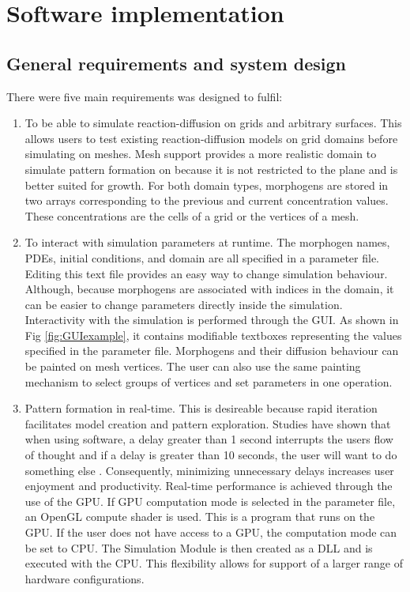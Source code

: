 \chapter{Software implementation}

\section{General requirements and system design}
There were five main requirements \ProgramName{} was designed to fulfil:

\begin{enumerate}
	\item To be able to simulate reaction-diffusion on grids and arbitrary surfaces. This allows users to test existing reaction-diffusion models on grid domains before simulating on meshes. Mesh support provides a more realistic domain to simulate pattern formation on because it is not restricted to the plane and is better suited for growth. For both domain types, morphogens are stored in two arrays corresponding to the previous and current concentration values. These concentrations are the cells of a grid or the vertices of a mesh. 
	
	\item To interact with simulation parameters at runtime. The morphogen names, PDEs, initial conditions, and domain are all specified in a parameter file. Editing this text file provides an easy way to change simulation behaviour. Although, because morphogens are associated with indices in the domain, it can be easier to change parameters directly inside the simulation. Interactivity with the simulation is performed through the GUI. As shown in Fig \ref{fig:GUIexample}, it contains modifiable textboxes representing the values specified in the parameter file. Morphogens and their diffusion behaviour can be painted on mesh vertices. The user can also use the same painting mechanism to select groups of vertices and set parameters in one operation. 

	\item Pattern formation in real-time. This is desireable because rapid iteration facilitates model creation and pattern exploration. Studies have shown that when using software, a delay greater than 1 second interrupts the users flow of thought and if a delay is greater than 10 seconds, the user will want to do something else \citep{nielsen1994usability}. Consequently, minimizing unnecessary delays increases user enjoyment and productivity. Real-time performance is achieved through the use of the GPU. If GPU computation mode is selected in the parameter file, an OpenGL compute shader is used. This is a program that runs on the GPU. If the user does not have access to a GPU, the computation mode can be set to CPU. The Simulation Module is then created as a DLL and is executed with the CPU. This flexibility allows for support of a larger range of hardware configurations. 
	

\end{enumerate}
